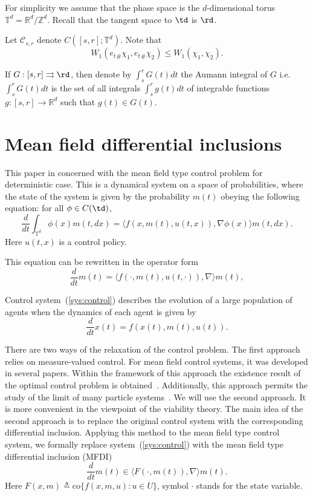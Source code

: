 \documentclass[12pt]{article}
\newcommand{\inttd}{\int_{\mathbb{T}^d}}
\begin{document}
For simplicity we assume that the phase space is the $d$-dimensional torus $\mathbb{T}^d=\mathbb{R}^d/\mathbb{Z}^d$. Recall that the tangent space to $\td$ is $\rd$. 

Let $\mathcal{C}_{s,r}$ denote $C([s,r];\mathbb{T}^d)$.
Note that 
\begin{equation}\label{estima:wasser}
W_1(e_t{}_\#\chi_1,e_t{}_\#\chi_2)\leq W_1(\chi_1,\chi_2).
\end{equation}

If $G:[s,r]\rightrightarrows \rd$, then denote by $\int_s^r G(t)dt$ the Aumann integral of $G$ i.e.
$\int_s^r G(t)dt$ is the set of all integrals  $\int_s^rg(t)dt$ of  integrable functions $g:[s,r]\rightarrow\mathbb{R}^d $ such that $g(t)\in G(t)$.

\section{Mean field differential inclusions}\label{sec:MFDI}
This paper in concerned with the mean field type control problem for deterministic case. This is a dynamical system on a space of probabilities, where the state of the system is given by the probability $m(t)$ obeying the following equation: for all $\phi\in C(\td)$,
$$\frac{d}{dt}\inttd \phi(x)m(t,dx)=\langle f(x,m(t),u(t,x)),\nabla \phi(x)\rangle m(t,dx). $$ Here $u(t,x)$ is a control policy. 

This equation can be rewritten in the operator form
\begin{equation}\label{sys:control}
\frac{d}{dt}m(t)=\langle f(\cdot,m(t),u(t,\cdot)),\nabla\rangle m(t),
\end{equation}


Control system~(\ref{sys:control}) describes the evolution of a large population of agents when the dynamics of each agent is given by 
\begin{equation}\label{sys:control_x}
\frac{d}{dt}x(t)=f(x(t),m(t),u(t)).
\end{equation} 


There are two ways of the relaxation of the control problem.  The first approach relies on measure-valued control. For mean field control systems, it was developed in several papers. Within the framework of this approach the existence result of the optimal control problem is obtained~\cite{Bahlali_Mezerdi_Mezerdi_existence}. Additionally, this approach permits the study of the limit of many particle systems~\cite{Lacker_limit}. 
We will use the second approach. It is more convenient in the viewpoint of the viability theory. The main idea of the second approach is to replace the original control system with the corresponding differential inclusion. Applying this  method to the mean field type control system, we formally replace  system~(\ref{sys:control}) with the mean field type differential inclusion (MFDI)
\begin{equation}\label{sys:mftdi}
\frac{d}{dt}m(t)\in\langle F(\cdot,m(t)),\nabla\rangle m(t).
\end{equation} Here $F(x,m)\triangleq \mathrm{co}\{f(x,m,u):u\in U\}$, symbol $\cdot$ stands for the state variable.
\end{document}

